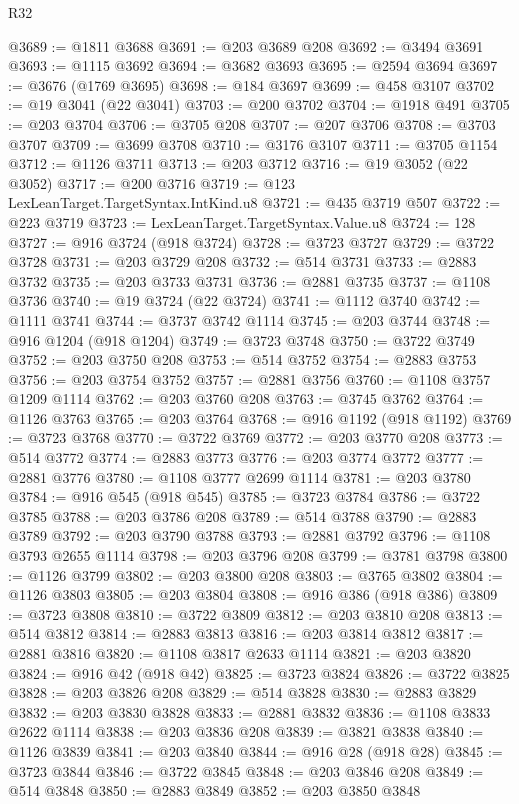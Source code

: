 \begin{lexlean}{R32}
\begin{coremodule}
@3689 := @1811 @3688
@3691 := @203 @3689 @208
@3692 := @3494 @3691
@3693 := @1115 @3692
@3694 := @3682 @3693
@3695 := @2594 @3694
@3697 := @3676 (@1769 @3695)
@3698 := @184 @3697
@3699 := @458 @3107
@3702 := @19 @3041 (@22 @3041)
@3703 := @200 @3702
@3704 := @1918 @491
@3705 := @203 @3704
@3706 := @3705 @208
@3707 := @207 @3706
@3708 := @3703 @3707
@3709 := @3699 @3708
@3710 := @3176 @3107
@3711 := @3705 @1154
@3712 := @1126 @3711
@3713 := @203 @3712
@3716 := @19 @3052 (@22 @3052)
@3717 := @200 @3716
@3719 := @123 LexLeanTarget.TargetSyntax.IntKind.u8
@3721 := @435 @3719 @507
@3722 := @223 @3719
@3723 := LexLeanTarget.TargetSyntax.Value.u8
@3724 := 128
@3727 := @916 @3724 (@918 @3724)
@3728 := @3723 @3727
@3729 := @3722 @3728
@3731 := @203 @3729 @208
@3732 := @514 @3731
@3733 := @2883 @3732
@3735 := @203 @3733 @3731
@3736 := @2881 @3735
@3737 := @1108 @3736
@3740 := @19 @3724 (@22 @3724)
@3741 := @1112 @3740
@3742 := @1111 @3741
@3744 := @3737 @3742 @1114
@3745 := @203 @3744
@3748 := @916 @1204 (@918 @1204)
@3749 := @3723 @3748
@3750 := @3722 @3749
@3752 := @203 @3750 @208
@3753 := @514 @3752
@3754 := @2883 @3753
@3756 := @203 @3754 @3752
@3757 := @2881 @3756
@3760 := @1108 @3757 @1209 @1114
@3762 := @203 @3760 @208
@3763 := @3745 @3762
@3764 := @1126 @3763
@3765 := @203 @3764
@3768 := @916 @1192 (@918 @1192)
@3769 := @3723 @3768
@3770 := @3722 @3769
@3772 := @203 @3770 @208
@3773 := @514 @3772
@3774 := @2883 @3773
@3776 := @203 @3774 @3772
@3777 := @2881 @3776
@3780 := @1108 @3777 @2699 @1114
@3781 := @203 @3780
@3784 := @916 @545 (@918 @545)
@3785 := @3723 @3784
@3786 := @3722 @3785
@3788 := @203 @3786 @208
@3789 := @514 @3788
@3790 := @2883 @3789
@3792 := @203 @3790 @3788
@3793 := @2881 @3792
@3796 := @1108 @3793 @2655 @1114
@3798 := @203 @3796 @208
@3799 := @3781 @3798
@3800 := @1126 @3799
@3802 := @203 @3800 @208
@3803 := @3765 @3802
@3804 := @1126 @3803
@3805 := @203 @3804
@3808 := @916 @386 (@918 @386)
@3809 := @3723 @3808
@3810 := @3722 @3809
@3812 := @203 @3810 @208
@3813 := @514 @3812
@3814 := @2883 @3813
@3816 := @203 @3814 @3812
@3817 := @2881 @3816
@3820 := @1108 @3817 @2633 @1114
@3821 := @203 @3820
@3824 := @916 @42 (@918 @42)
@3825 := @3723 @3824
@3826 := @3722 @3825
@3828 := @203 @3826 @208
@3829 := @514 @3828
@3830 := @2883 @3829
@3832 := @203 @3830 @3828
@3833 := @2881 @3832
@3836 := @1108 @3833 @2622 @1114
@3838 := @203 @3836 @208
@3839 := @3821 @3838
@3840 := @1126 @3839
@3841 := @203 @3840
@3844 := @916 @28 (@918 @28)
@3845 := @3723 @3844
@3846 := @3722 @3845
@3848 := @203 @3846 @208
@3849 := @514 @3848
@3850 := @2883 @3849
@3852 := @203 @3850 @3848

\end{coremodule}
\end{lexlean}
